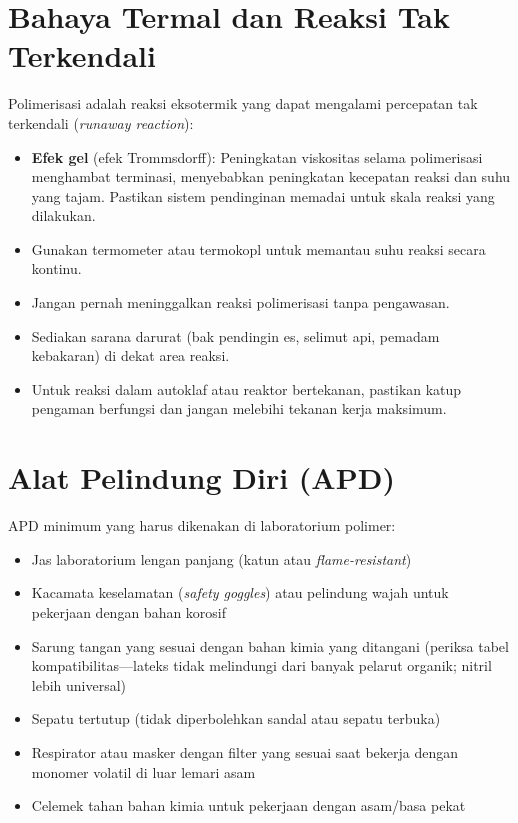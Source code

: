 \documentclass[12pt,a4paper,openany]{book}
\begin{document}
\section*{Bahaya Termal dan Reaksi Tak Terkendali}

Polimerisasi adalah reaksi eksotermik yang dapat mengalami percepatan tak terkendali (\textit{runaway reaction}):

\begin{itemize}
\item \textbf{Efek gel} (efek Trommsdorff): Peningkatan viskositas selama polimerisasi menghambat terminasi, menyebabkan peningkatan kecepatan reaksi dan suhu yang tajam. Pastikan sistem pendinginan memadai untuk skala reaksi yang dilakukan.
\item Gunakan termometer atau termokopl untuk memantau suhu reaksi secara kontinu.
\item Jangan pernah meninggalkan reaksi polimerisasi tanpa pengawasan.
\item Sediakan sarana darurat (bak pendingin es, selimut api, pemadam kebakaran) di dekat area reaksi.
\item Untuk reaksi dalam autoklaf atau reaktor bertekanan, pastikan katup pengaman berfungsi dan jangan melebihi tekanan kerja maksimum.
\end{itemize}

\section*{Alat Pelindung Diri (APD)}

APD minimum yang harus dikenakan di laboratorium polimer:

\begin{itemize}
\item Jas laboratorium lengan panjang (katun atau \textit{flame-resistant})
\item Kacamata keselamatan (\textit{safety goggles}) atau pelindung wajah untuk pekerjaan dengan bahan korosif
\item Sarung tangan yang sesuai dengan bahan kimia yang ditangani (periksa tabel kompatibilitas---lateks tidak melindungi dari banyak pelarut organik; nitril lebih universal)
\item Sepatu tertutup (tidak diperbolehkan sandal atau sepatu terbuka)
\item Respirator atau masker dengan filter yang sesuai saat bekerja dengan monomer volatil di luar lemari asam
\item Celemek tahan bahan kimia untuk pekerjaan dengan asam/basa pekat
\end{itemize}
\end{document}
